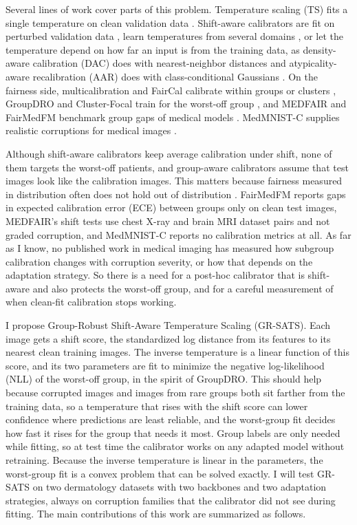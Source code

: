 \documentclass[sigconf,nonacm]{acmart}
\begin{document}
Several lines of work cover parts of this problem. Temperature scaling (TS) fits a single temperature on clean validation data \cite{guo2017calibration}. Shift-aware calibrators are fit on perturbed validation data \cite{tomani2021posthoc}, learn temperatures from several domains \cite{yu2022multidomain}, or let the temperature depend on how far an input is from the training data, as density-aware calibration (DAC) does with nearest-neighbor distances \cite{tomani2023dac} and atypicality-aware recalibration (AAR) does with class-conditional Gaussians \cite{yuksekgonul2023atypicality}. On the fairness side, multicalibration and FairCal calibrate within groups or clusters \cite{hebertjohnson2018multicalibration,salvador2022faircal}, GroupDRO and Cluster-Focal train for the worst-off group \cite{sagawa2020groupdro,shui2023clusterfocal}, and MEDFAIR and FairMedFM benchmark group gaps of medical models \cite{zong2023medfair,jin2024fairmedfm}. MedMNIST-C supplies realistic corruptions for medical images \cite{disalvo2024medmnistc}.

Although shift-aware calibrators keep average calibration under shift, none of them targets the worst-off patients, and group-aware calibrators assume that test images look like the calibration images. This matters because fairness measured in distribution often does not hold out of distribution \cite{schrouff2022diagnosing,yang2024limits}. FairMedFM reports gaps in expected calibration error (ECE) between groups only on clean test images, MEDFAIR's shift tests use chest X-ray and brain MRI dataset pairs and not graded corruption, and MedMNIST-C reports no calibration metrics at all. As far as I know, no published work in medical imaging has measured how subgroup calibration changes with corruption severity, or how that depends on the adaptation strategy. So there is a need for a post-hoc calibrator that is shift-aware and also protects the worst-off group, and for a careful measurement of when clean-fit calibration stops working.

I propose Group-Robust Shift-Aware Temperature Scaling (GR-SATS). Each image gets a shift score, the standardized log distance from its features to its nearest clean training images. The inverse temperature is a linear function of this score, and its two parameters are fit to minimize the negative log-likelihood (NLL) of the worst-off group, in the spirit of GroupDRO. This should help because corrupted images and images from rare groups both sit farther from the training data, so a temperature that rises with the shift score can lower confidence where predictions are least reliable, and the worst-group fit decides how fast it rises for the group that needs it most. Group labels are only needed while fitting, so at test time the calibrator works on any adapted model without retraining. Because the inverse temperature is linear in the parameters, the worst-group fit is a convex problem that can be solved exactly. I will test GR-SATS on two dermatology datasets with two backbones and two adaptation strategies, always on corruption families that the calibrator did not see during fitting. The main contributions of this work are summarized as follows.
\end{document}
